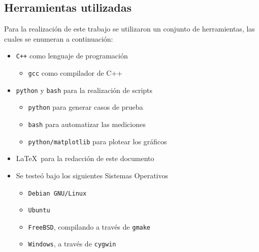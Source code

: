 \documentclass[11pt, a4paper, twoside]{article}
\begin{document}
{}

\subsection{Herramientas utilizadas}\label{subsec:instrucciones-herramientas}

Para la realización de este trabajo se utilizaron un conjunto de herramientas, las cuales se enumeran a continuación:

\begin{itemize}
  \item \texttt{C++} como lenguaje de programación
    \begin{itemize}
      \item \texttt{gcc} como compilador de C++
    \end{itemize}
  \item \texttt{python} y \texttt{bash} para la realización de scripts
    \begin{itemize}
      \item \texttt{python} para generar casos de prueba
      \item \texttt{bash} para automatizar las mediciones
      \item \texttt{python/matplotlib} para plotear los gráficos
    \end{itemize}
  \item \LaTeX\ para la redacción de este documento
  \item Se testeó bajo los siguientes Sistemas Operativos \hfill
    \begin{itemize}
      \item \texttt{Debian GNU/Linux}
      \item \texttt{Ubuntu}
      \item \texttt{FreeBSD}, compilando a través de \texttt{gmake}
      \item \texttt{Windows}, a través de \texttt{cygwin}
    \end{itemize}
\end{itemize}

\end{document}

